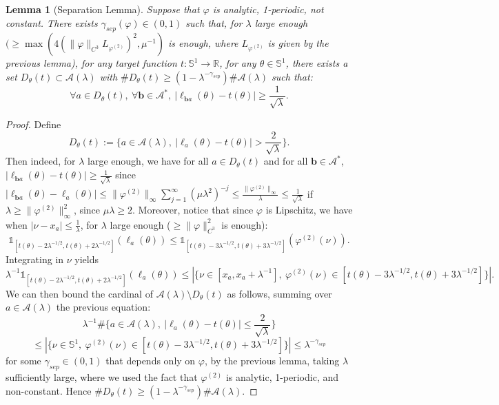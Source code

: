 \documentclass[11pt]{amsart}
\theoremstyle{plain}
\newtheorem{lemma}[theorem]{Lemma}
\theoremstyle{definition}
\numberwithin{equation}{section}
\begin{document}
\begin{lemma}[Separation Lemma]
Suppose that $\varphi$ is analytic, 1-periodic, not constant. There exists $\gamma_{sep}(\varphi) \in (0,1)$ such that, for $\lambda$ large enough $(\geq \max(4(\|\varphi\|_{C^3} L_{\varphi^{(2)}})^{2}, \mu^{-1}) $ is enough, where $L_{\varphi^{(2)}}$ is given by the previous lemma), for any target function $t:\mathbb{S}^1 \rightarrow \mathbb{R}$, for any $\theta \in \mathbb{S}^1$, there exists a set $D_\theta(t)  \subset \mathcal{A}(\lambda)$ with $\# D_{\theta}(t) \geq (1-\lambda^{-\gamma_{sep}}) \#\mathcal{A}(\lambda)$ such that: 
$$ \forall a \in D_\theta(t), \ \forall \mathbf{b} \in \mathcal{A}^*, \ |\ell_{\mathbf{b}a}(\theta) -t(\theta)| \geq \frac{1}{\sqrt{\lambda}}. $$
\end{lemma}

\begin{proof}
Define 
$$D_\theta(t) := \Big\{a \in \mathcal{A}(\lambda), \ |\ell_a(\theta)-t(\theta)| > \frac{2}{\sqrt{\lambda}}\Big\}.$$
Then indeed, for $\lambda$ large enough, we have for all $a \in D_\theta(t)$ and for all $\mathbf{b} \in \mathcal{A}^*$, $|\ell_{\mathbf{b}a}(\theta)-t(\theta)| \geq \frac{1}{\sqrt{\lambda}}$ since  $ |\ell_{\mathbf{b}a}(\theta) - \ell_a(\theta)| \leq  {\|\varphi^{(2)}\|_{\infty}} \sum_{j=1}^\infty (\mu \lambda^2)^{-j} \leq  \frac{\|\varphi^{(2)}\|_{\infty}}{\lambda}\leq \frac{1}{\sqrt{\lambda}} $ if $\lambda \geq \|\varphi^{(2)}\|_{\infty}^2$, since $\mu \lambda \geq 2$. 
Moreover, notice that since $\varphi$ is Lipschitz, we have when $|\nu-x_a|\leq \frac{1}{\lambda}$, for $\lambda$ large enough ($\geq \|\varphi\|_{C^3}^2 $ is enough):
$$ \mathbb{1}_{[t(\theta)-2\lambda^{-1/2},t(\theta)+2\lambda^{-1/2}]}(\ell_a(\theta)) \leq \mathbb{1}_{[t(\theta)-3\lambda^{-1/2},t(\theta)+3\lambda^{-1/2}]}(\varphi^{(2)}(\nu))  .$$
Integrating in $\nu$ yields 
$$ \lambda^{-1} \mathbb{1}_{[t(\theta)-2\lambda^{-1/2},t(\theta)+2\lambda^{-1/2}]}(\ell_a(\theta)) \leq |\{ \nu \in [x_a,x_a+\lambda^{-1}], \ \varphi^{(2)}(\nu) \in [t(\theta)-3\lambda^{-1/2},t(\theta)+3\lambda^{-1/2}] \}| . $$
We can then bound the cardinal of $\mathcal{A}(\lambda) \setminus D_\theta(t)$ as follows, summing over $a \in \mathcal{A}(\lambda)$ the previous equation:
$$ \lambda^{-1} \#\Big\{a \in \mathcal{A}(\lambda), \ |\ell_a(\theta)-t(\theta)| \leq \frac{2}{\sqrt{\lambda}}\Big\}  $$ $$ \leq |\{ \nu \in \mathbb{S}^1, \ \varphi^{(2)}(\nu) \in [t(\theta)-3\lambda^{-1/2},t(\theta)+3\lambda^{ -1/2}] \}| \leq \lambda^{-\gamma_{sep}} $$
for some $\gamma_{sep} \in (0,1)$ that depends only on $\varphi$, by the previous lemma, taking $\lambda$ sufficiently large, where we used the fact that $\varphi^{(2)}$ is analytic, 1-periodic, and non-constant. Hence $\#D_\theta(t)\geq (1-\lambda^{-\gamma_{sep}})\#\mathcal{A}(\lambda)$.
\end{proof}
\end{document}
